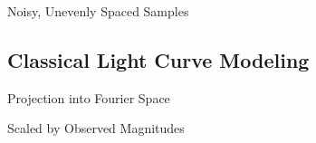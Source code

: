 \documentclass{beamer}
\begin{document}
\begin{frame}{Noisy, Unevenly Spaced Samples}
\begin{figure}
\centering

\end{figure} 
\end{frame}

\subsection{Classical Light Curve Modeling}

\begin{frame}{Projection into Fourier Space}
\makebox[\textwidth][c]{}
\end{frame}

\begin{frame}{Scaled by Observed Magnitudes}
\makebox[\textwidth][c]{}
\end{frame}
\end{document}
